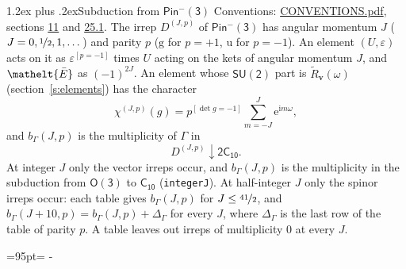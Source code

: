 \documentclass[10pt,a4paper]{article}
\makeatletter
\renewcommand\section{\@startsection{section}{1}{\z@}{-3ex plus -1ex minus -.2ex}%
  {1.2ex plus .2ex}{\normalfont\large\sffamily\bfseries\color{parttitle}}}
\newcommand{\needspace}[1]{\par\penalty-100\begingroup\dimen0=#1\relax\dimen2=\pagegoal
  \advance\dimen2-\pagetotal\ifdim\dimen0>\dimen2\relax\ifdim\dimen2>0pt\vfil\break\fi\fi
  \endgroup}
\numberwithin{equation}{section}
\newcommand{\eltfont}[1]{{\let\sigma\eltsigma\mathelt{#1}}}
\newcommand{\grp}[1]{\mathsf{#1}}
\newcommand{\elt}[1]{\eltfont{#1}}
\newcommand{\ptag}[1]{\mathrm{#1}}
\newcommand{\iverson}[1]{[#1]}
\newcommand{\restr}[2]{#1\!\downarrow#2}
\newcommand{\vv}{\mathbf{v}}
\newcommand{\iunit}{\mathrm{i}}
\newcommand{\expe}{\mathrm{e}}
\newcommand{\irrJp}[2]{D^{(#1,#2)}}
\newcommand{\barred}[1]{\bar{#1}}
\newcommand{\lift}[1]{\tilde{#1}}
\makeatother
\begin{document}
\section{Subduction from \texorpdfstring{$\grp{Pin^{-}(3)}$}{Pin(3)}}\label{s:subduction_parent}
Conventions: \href{../../CONVENTIONS.pdf}{CONVENTIONS.pdf}, sections \href{../../../rotation/CONVENTIONS.pdf\#conv.11}{11} and \href{../../CONVENTIONS.pdf\#conv.25.1}{25.1}.
\leavevmode\label{n:index.J}\label{n:index.parity}\label{n:irrep.o3}The irrep $\irrJp{J}{p}$ of \href{Pinminus3.pdf}{$\grp{Pin^{-}(3)}$} has angular momentum $J$ ($J = 0, \nicefrac{1}{2}, 1, \dots$) and parity $p$ ($\ptag{g}$ for $p = +1$, $\ptag{u}$ for $p = -1$). An element $(U, \varepsilon)$ acts on it as $\varepsilon^{[p = -1]}$ times $U$ acting on the kets of angular momentum $J$, and $\elt{\barred{E}}$ as $(-1)^{2J}$. \label{n:function.character.parent}\label{n:function.multiplicity}An element whose $\grp{SU(2)}$ part is $\lift{R}_{\vv}(\omega)$ (section~\ref{s:elements}) has the character
\begin{equation}\label{e:chi}\chi^{(J,p)}(g) = p^{\iverson{\det g = -1}}\sum_{m=-J}^{J} \expe^{\iunit m\omega},\end{equation}
and $b_\Gamma(J, p)$ is the multiplicity of $\Gamma$ in
\begin{equation}\label{e:parent}\restr{\irrJp{J}{p}}{\grp{2C_{10}}}.\end{equation}
At integer $J$ only the vector irreps occur, and $b_\Gamma(J, p)$ is the multiplicity in the subduction from $\grp{O(3)}$ to \href{../../../rotation/data/pdf/C10.pdf}{$\grp{C_{10}}$} (\texttt{integerJ}). \label{n:index.increment}At half-integer $J$ only the spinor irreps occur: each table gives $b_\Gamma(J, p)$ for $J \le \nicefrac{41}{2}$, and $b_\Gamma(J + 10, p) = b_\Gamma(J, p) + \Delta_\Gamma$ for every $J$, where $\Delta_\Gamma$ is the last row of the table of parity $p$. A table leaves out irreps of multiplicity 0 at every $J$.
\needspace{95pt}
\end{document}
